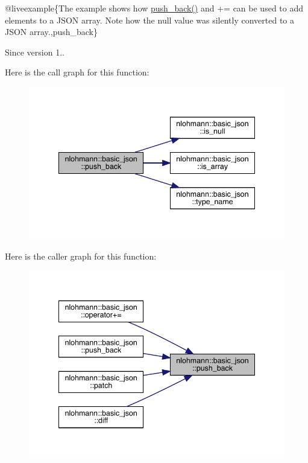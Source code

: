 @liveexample\{The example shows how {\ttfamily \mbox{\hyperlink{classnlohmann_1_1basic__json_ac8e523ddc8c2dd7e5d2daf0d49a9c0d7}{push\+\_\+back()}}} and {\ttfamily +=} can be used to add elements to a J\+S\+ON array. Note how the {\ttfamily null} value was silently converted to a J\+S\+ON array.,push\+\_\+back\}

\begin{DoxySince}{Since}
version 1.. 
\end{DoxySince}
Here is the call graph for this function\+:\nopagebreak
\begin{figure}[H]
\begin{center}
\leavevmode
\includegraphics[width=341pt]{classnlohmann_1_1basic__json_ac8e523ddc8c2dd7e5d2daf0d49a9c0d7_cgraph}
\end{center}
\end{figure}
Here is the caller graph for this function\+:\nopagebreak
\begin{figure}[H]
\begin{center}
\leavevmode
\includegraphics[width=341pt]{classnlohmann_1_1basic__json_ac8e523ddc8c2dd7e5d2daf0d49a9c0d7_icgraph}
\end{center}
\end{figure}
